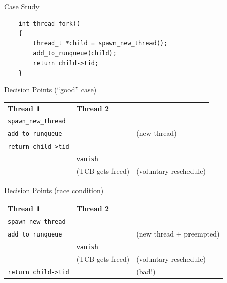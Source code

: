 \documentclass[xcolor=dvipsnames]{beamer}
\begin{document}

\begin{frame}[fragile]{Case Study}
	\begin{center}
	\begin{verbatim}
	int thread_fork()
	{
	    thread_t *child = spawn_new_thread();
	    add_to_runqueue(child);
	    return child->tid;
	}
	\end{verbatim}
	\end{center}

\end{frame}

\begin{frame}{Decision Points (``good'' case)}
	\begin{tabular}{|l|l|l}
		\cline{1-2}
		{\bf Thread 1} & {\bf Thread 2} & \\
		\cline{1-2}
		\texttt{spawn\_new\_thread} && \\
		\cline{1-2}
		\texttt{add\_to\_runqueue} && (new thread) \\
		\cline{1-2}
		\texttt{return child->tid} &&  \\
		\cline{1-2}
		& \texttt{vanish} & \\
		\cline{1-2}
		& (TCB gets freed) & (voluntary reschedule) \\
		\cline{1-2}
	\end{tabular}
\end{frame}

\begin{frame}{Decision Points (race condition)}
	\begin{tabular}{|l|l|l}
		\cline{1-2}
		{\bf Thread 1} & {\bf Thread 2} & \\
		\cline{1-2}
		\texttt{spawn\_new\_thread} && \\
		\cline{1-2}
		\texttt{add\_to\_runqueue} && (new thread + preempted) \\
		\cline{1-2}
		& \texttt{vanish} & \\
		\cline{1-2}
		& (TCB gets freed) & (voluntary reschedule) \\
		\cline{1-2}
		\texttt{return child->tid} && (bad!) \\
		\cline{1-2}
	\end{tabular}
\end{frame}
\end{document}
